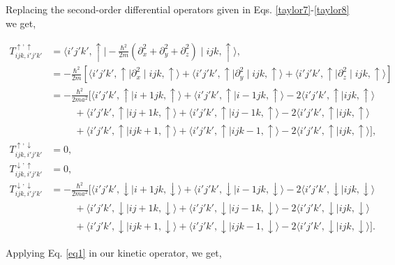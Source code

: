 \documentclass[10pt,prb,showpacs,amssymb,floatfix]{revtex4-1}
\newcommand{\nn}{\nonumber}
\begin{document}
Replacing the second-order differential operators given in Eqs. \eqref{taylor7}-\eqref{taylor8} we get,

\begin{align}
\label{eqP12200}
T_{ijk,i'j'k'}^{\uparrow,\uparrow} &= \langle i'j'k',\uparrow \mid -\frac{\hbar^2}{2m} (\partial_x^2 +\partial_y^2+\partial_z^2 ) \mid ijk,\uparrow \rangle, \nn\\
&= -\frac{\hbar^2}{2m}[ \langle i'j'k',\uparrow \mid \partial_x^2 \mid ijk,\uparrow \rangle + \langle i'j'k',\uparrow \mid \partial_y^2 \mid ijk,\uparrow \rangle + \langle i'j'k',\uparrow \mid \partial_z^2 \mid ijk,\uparrow \rangle] \nn\\
&=-\frac{\hbar^2}{2ma^2}[ \langle i'j'k',\uparrow \mid i+1jk,\uparrow \rangle + \langle i'j'k',\uparrow \mid i-1jk,\uparrow \rangle - 2 \langle i'j'k',\uparrow \mid ijk,\uparrow \rangle \nn\\ &~~~~~~~~~~~+ \langle i'j'k',\uparrow \mid  ij+1k,\uparrow \rangle +  \langle i'j'k',\uparrow \mid  ij-1k,\uparrow \rangle - 2 \langle i'j'k',\uparrow \mid  ijk,\uparrow \rangle \nn\\&~~~~~~~~~~~+ \langle i'j'k',\uparrow  \mid ijk+1,\uparrow \rangle+  \langle i'j'k',\uparrow  \mid ijk-1,\uparrow \rangle - 2 \langle i'j'k',\uparrow  \mid ijk,\uparrow \rangle], \\
\label{eqP12211}
T_{ijk,i'j'k'}^{\uparrow,\downarrow} &= 0, \\
\label{eqP12222}
T_{ijk,i'j'k'}^{\downarrow,\uparrow} &= 0, \\
T_{ijk,i'j'k'}^{\downarrow,\downarrow} &= -\frac{\hbar^2}{2ma^2}[ \langle i'j'k',\downarrow \mid i+1jk,\downarrow \rangle + \langle i'j'k',\downarrow \mid i-1jk,\downarrow \rangle - 2 \langle i'j'k',\downarrow \mid ijk,\downarrow \rangle \nn\\ &~~~~~~~~~~~+ \langle i'j'k',\downarrow \mid  ij+1k,\downarrow \rangle +  \langle i'j'k',\downarrow \mid  ij-1k,\downarrow \rangle - 2 \langle i'j'k',\downarrow \mid  ijk,\downarrow \rangle \nn\\&~~~~~~~~~~~+ \langle i'j'k',\downarrow  \mid ijk+1,\downarrow \rangle+  \langle i'j'k',\downarrow  \mid ijk-1,\downarrow \rangle - 2 \langle i'j'k',\downarrow  \mid ijk,\downarrow \rangle]. 
\label{eqP1233}
\end{align}

Applying Eq. \eqref{eq1} in our kinetic operator, we get,
\end{document}
